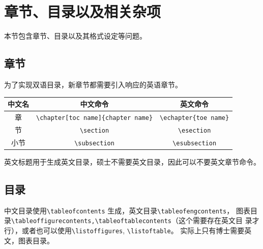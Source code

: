 \section{章节、目录以及相关杂项}
\label{sec:Chapter-section-contents-others}
本节包含章节、目录以及其格式设定等问题。
\subsection{章节}
%
\label{sub:chapter-section}
为了实现双语目录，新章节都需要引入响应的英语章节。
\begin{table}[h]
    \centering
    \begin{tabular*}{0.85\textwidth}{@{\extracolsep{\fill}}ccc}
	\hline
     中文名& 中文命令 & 英文命令 \\ \hline
     章 & \verb|\chapter[toc name]{chapter name}| & \verb|\echapter{toe name}| \\ \hline
     节 & \verb|\section| & \verb|\esection| \\ \hline
     小节 & \verb|\subsection| & \verb|\esubsection| \\ \hline
    \end{tabular*}
\end{table}
英文标题用于生成英文目录，硕士不需要英文目录，因此可以不要英文章节命令。

\subsection{目录}
%
\label{sub:contents}
中文目录使用\verb|\tableofcontents| 生成，英文目录\verb|\tableofengcontents|，
图表目录\verb|\tableoffigurecontents,\tableoftablecontents|（这个需要存在英文目
录才行），或者也可以使用\verb|\listoffigures|, \verb|\listoftable|。
实际上只有博士需要英文，图表目录。

